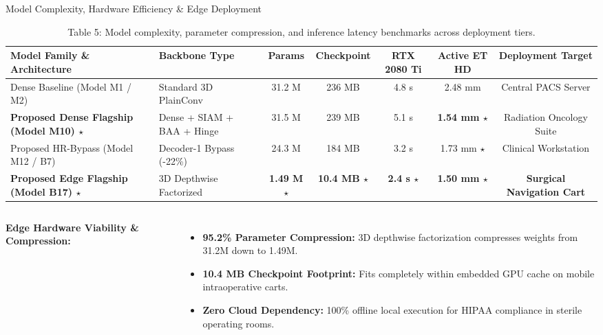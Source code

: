 \documentclass[aspectratio=169, 10pt]{beamer}
\begin{document}
\begin{frame}{Model Complexity, Hardware Efficiency \& Edge Deployment}
  \begin{table}
    \centering
    \scriptsize
    \begin{tabular}{llccccc}
      \toprule
      \textbf{Model Family \& Architecture} & \textbf{Backbone Type} & \textbf{Params} & \textbf{Checkpoint} & \textbf{RTX 2080 Ti} & \textbf{Active ET HD} & \textbf{Deployment Target} \\
      \midrule
      Dense Baseline (Model M1 / M2) & Standard 3D PlainConv & 31.2 M & 236 MB & 4.8 s & 2.48 mm & Central PACS Server \\
      \textbf{Proposed Dense Flagship (Model M10) $\star$} & Dense + SIAM + BAA + Hinge & 31.5 M & 239 MB & 5.1 s & \textbf{1.54 mm $\star$} & Radiation Oncology Suite \\
      Proposed HR-Bypass (Model M12 / B7) & Decoder-1 Bypass (-22\%) & 24.3 M & 184 MB & 3.2 s & 1.73 mm $\star$ & Clinical Workstation \\
      \textbf{Proposed Edge Flagship (Model B17) $\star$} & 3D Depthwise Factorized & \textbf{1.49 M $\star$} & \textbf{10.4 MB $\star$} & \textbf{2.4 s $\star$} & \textbf{1.50 mm $\star$} & \textbf{Surgical Navigation Cart} \\
      \bottomrule
    \end{tabular}
    \caption{Table 5: Model complexity, parameter compression, and inference latency benchmarks across deployment tiers.}
    \label{tab:hardware_benchmarks}
  \end{table}
  
  \vspace{0.2cm}
  \begin{columns}[T]
    \textbf{Edge Hardware Viability \& Compression:}
    \begin{itemize}\itemsep=2pt
      \scriptsize
      \item \textbf{95.2\% Parameter Compression:} 3D depthwise factorization compresses weights from 31.2M down to 1.49M.
      \item \textbf{10.4 MB Checkpoint Footprint:} Fits completely within embedded GPU cache on mobile intraoperative carts.
      \item \textbf{Zero Cloud Dependency:} 100\% offline local execution for HIPAA compliance in sterile operating rooms.
    \end{itemize}
    

\end{columns}
\end{frame}
\end{document}
